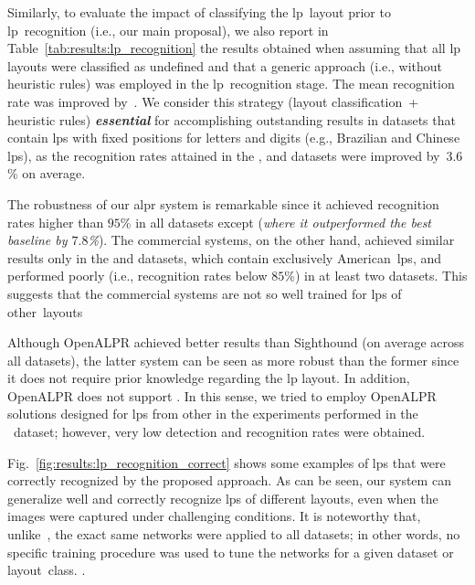 Similarly, to evaluate the impact of classifying the \gls*{lp}~layout prior to \gls*{lp}~recognition (i.e., our main proposal), we also report in Table~\ref{tab:results:lp_recognition} the results obtained when assuming that all \gls*{lp} layouts were classified as undefined and that a generic approach (i.e., without heuristic rules) was employed in the \gls*{lp}~recognition stage.
The mean recognition rate was improved by~\improvelayoutclassification.
We consider this strategy (layout classification~+ heuristic rules) \emph{\textbf{essential}} for accomplishing outstanding results in datasets that contain \glspl*{lp} with fixed positions for letters and digits (e.g., Brazilian and Chinese \glspl*{lp}), as the recognition rates attained in the \chinese, \ssig and \dataset datasets were improved by~$3.6$\% on average.

The robustness of our \gls*{alpr} system is remarkable since it achieved recognition rates higher than $95$\% in all datasets except \dataset (\textit{where it outperformed the best baseline by $7.8$\%}).
The commercial systems, on the other hand, achieved similar results only in the \caltech and \stills datasets, which contain exclusively American~\glspl*{lp}, and performed poorly (i.e., recognition rates below $85$\%) in at least two datasets. 
This suggests that the commercial systems are not so well trained for \glspl*{lp} of other~layouts 

Although OpenALPR achieved better results than Sighthound (on average across all datasets), the latter system can be seen as more robust than the former since it does not require prior knowledge regarding the \gls*{lp} layout. 
In addition, OpenALPR does not support .
In this sense, we tried to employ OpenALPR solutions designed for \glspl*{lp} from other  in the experiments performed in the \aolp~dataset; however, very low detection and recognition rates were obtained.



Fig.~\ref{fig:results:lp_recognition_correct} shows some examples of \glspl*{lp} that were correctly recognized by the proposed approach. As can be seen, our system can generalize well and correctly recognize \glspl*{lp} of different layouts, even when the images were captured under challenging conditions. It is noteworthy that, unlike~\cite{panahi2017accurate,laroca2018robust,zhuang2018towards}, the exact same networks were applied to all datasets; in other words, no specific training procedure was used to tune the networks for a given dataset or layout~class.
.

